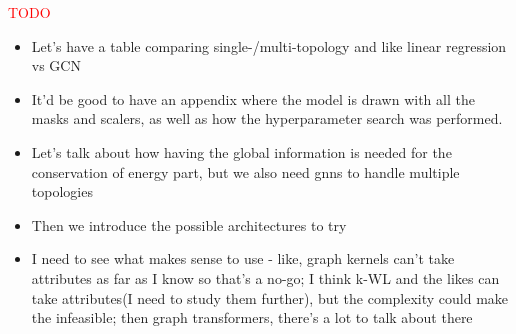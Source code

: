 \textcolor{red}{TODO}


\begin{itemize}
    \item Let's have a table comparing single-/multi-topology and like linear regression vs GCN
    \item It'd be good to have an appendix where the model is drawn with all the masks and scalers,
    as well as how the hyperparameter search was performed.
    \item Let's talk about how having the global information is needed for the conservation of energy
    part, but we also need gnns to handle multiple topologies
    \item Then we introduce the possible architectures to try
    \item I need to see what makes sense to use - like, graph kernels can't take attributes as far as I
    know so that's a no-go; I think k-WL and the likes can take attributes(I need to study them further),
    but the complexity could make the infeasible; then graph transformers, there's a lot to talk about there
\end{itemize}